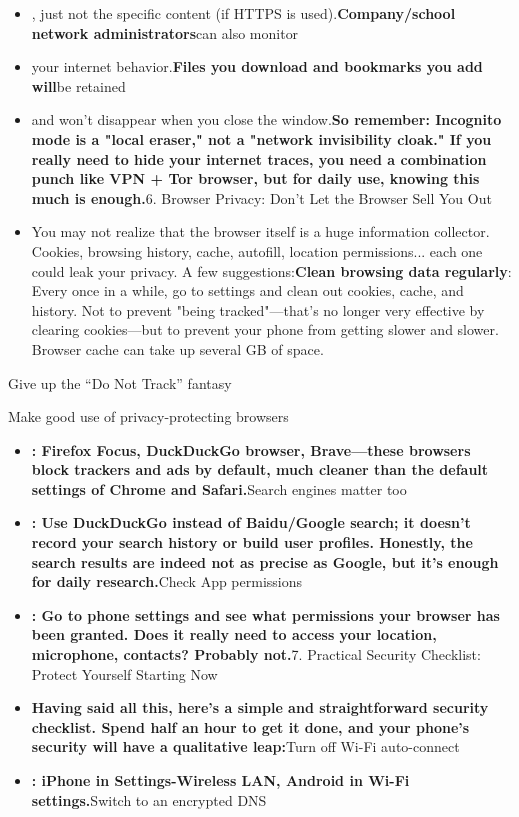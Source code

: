 \begin{itemize}
  \item , just not the specific content (if HTTPS is used).\textbf{Company/school network administrators}can also monitor
  \item your internet behavior.\textbf{Files you download and bookmarks you add will}be retained
  \item and won't disappear when you close the window.\textbf{So remember: Incognito mode is a "local eraser," not a "network invisibility cloak." If you really need to hide your internet traces, you need a combination punch like VPN + Tor browser, but for daily use, knowing this much is enough.}6. Browser Privacy: Don't Let the Browser Sell You Out
  \item You may not realize that the browser itself is a huge information collector. Cookies, browsing history, cache, autofill, location permissions... each one could leak your privacy. A few suggestions:\textbf{Clean browsing data regularly}: Every once in a while, go to settings and clean out cookies, cache, and history. Not to prevent "being tracked"—that's no longer very effective by clearing cookies—but to prevent your phone from getting slower and slower. Browser cache can take up several GB of space.
\end{itemize}

Give up the “Do Not Track” fantasy


Make good use of privacy-protecting browsers

\begin{itemize}
  \item \textbf{: Firefox Focus, DuckDuckGo browser, Brave—these browsers block trackers and ads by default, much cleaner than the default settings of Chrome and Safari.}Search engines matter too
  \item \textbf{: Use DuckDuckGo instead of Baidu/Google search; it doesn't record your search history or build user profiles. Honestly, the search results are indeed not as precise as Google, but it's enough for daily research.}Check App permissions
  \item \textbf{: Go to phone settings and see what permissions your browser has been granted. Does it really need to access your location, microphone, contacts? Probably not.}7. Practical Security Checklist: Protect Yourself Starting Now
  \item \textbf{Having said all this, here's a simple and straightforward security checklist. Spend half an hour to get it done, and your phone's security will have a qualitative leap:}Turn off Wi-Fi auto-connect
  \item \textbf{: iPhone in Settings-Wireless LAN, Android in Wi-Fi settings.}Switch to an encrypted DNS
\end{itemize}

